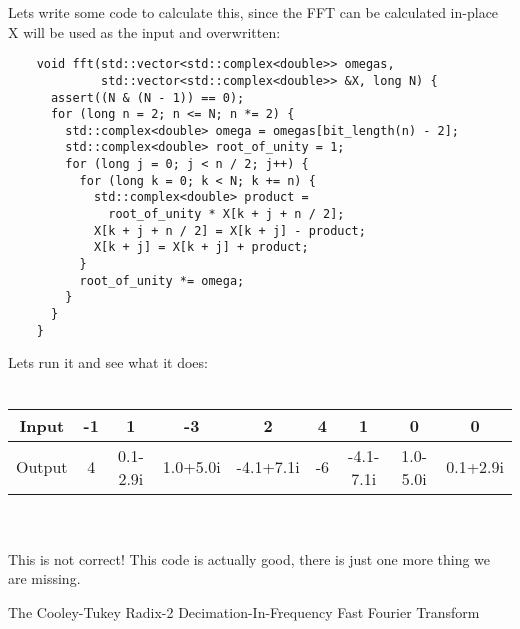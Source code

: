\documentclass{beamer}
\begin{document}
\begin{frame}[fragile]
  Lets write some code to calculate this, since the FFT can be calculated in-place X will be used as the input and overwritten:
  \begin{lstlisting}
    void fft(std::vector<std::complex<double>> omegas, 
             std::vector<std::complex<double>> &X, long N) {
      assert((N & (N - 1)) == 0);
      for (long n = 2; n <= N; n *= 2) {
        std::complex<double> omega = omegas[bit_length(n) - 2];
        std::complex<double> root_of_unity = 1;
        for (long j = 0; j < n / 2; j++) {
          for (long k = 0; k < N; k += n) {
            std::complex<double> product = 
              root_of_unity * X[k + j + n / 2];
            X[k + j + n / 2] = X[k + j] - product;
            X[k + j] = X[k + j] + product;
          }
          root_of_unity *= omega;
        }
      }
    }
  \end{lstlisting}
\end{frame}

\begin{frame}
  Lets run it and see what it does:\\~\\
  \begin{adjustbox}{width=\textwidth}
    \begin{tabular}{ |c|c|c|c|c|c|c|c|c| }
      \hline
      Input  & -1 & 1        & -3       & 2         & 4  & 1         & 0        & 0        \\
      \hline
      Output & 4  & 0.1-2.9i & 1.0+5.0i & -4.1+7.1i & -6 & -4.1-7.1i & 1.0-5.0i & 0.1+2.9i \\
      \hline
    \end{tabular}
  \end{adjustbox}\\~\\
  This is not correct! This code is actually good, there is just one more thing we are missing.

\end{frame}

\begin{frame}{The Cooley-Tukey Radix-2 Decimation-In-Frequency Fast Fourier Transform}
  \begin{adjustbox}{width=\textwidth}
  \end{adjustbox}
\end{frame}
\end{document}
